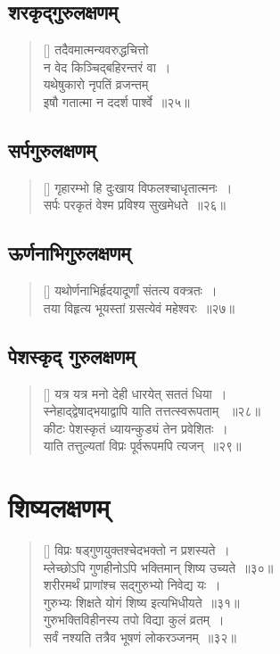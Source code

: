 \documentclass[twoside,12pt,notitlepage]{book}
\begin{document}
\subsection*{शरकृद्‌गुरुलक्षणम्}
\begin{verse}[\versewidth]
तदैवमात्मन्यवरुद्धचित्तो\\[-6pt] न वेद किञ्चिद्बहिरन्तरं वा~।\\[-6pt]
यथेषुकारो नृपतिं व्रजन्तम्\\[-6pt] इषौ गतात्मा न ददर्श पार्श्वे~॥२५॥\footA 
\end{verse}


\subsection*{सर्पगुरुलक्षणम्}
\begin{verse}[\versewidth]
गृहारम्भो हि दुःखाय विफलश्चाधृतात्मनः~।\\[-6pt]
सर्पः परकृतं वेश्म प्रविश्य सुखमेधते~॥२६॥\footA 
\end{verse}



\subsection*{ऊर्णनाभिगुरुलक्षणम्}
\begin{verse}[\versewidth]
यथोर्णनाभिर्हृदयादूर्णां संतत्य वक्त्रतः~।\\[-6pt]
तया विहृत्य भूयस्तां ग्रसत्येवं महेश्वरः~॥२७॥\footA 

\end{verse}

\subsection*{पेशस्कृद् गुरुलक्षणम्}
\begin{verse}[\versewidth]
यत्र यत्र मनो देही धारयेत् सततं धिया~।\\[-6pt]
स्नेहाद्द्वेषाद्भयाद्वापि याति तत्तत्स्वरूपताम् ~॥२८॥\\
कीटः पेशस्कृतं ध्यायन्कुड्यं तेन प्रवेशितः~।\\[-6pt]
याति तत्तुल्यतां विप्रः पूर्वरूपमपि त्यजन्~॥२९॥\footA 

\end{verse}

\section {शिष्यलक्षणम्}
\begin{verse}[\versewidth]
विप्रः षड्गुणयुक्तश्चेदभक्तो न प्रशस्यते~।\\[-6pt]
म्लेच्छोऽपि गुणहीनोऽपि भक्तिमान् शिष्य उच्यते~॥३०॥\footA \\ 
शरीरमर्थं प्राणांश्च सद्गुरुभ्यो निवेद्य यः~।\\[-6pt]
गुरुभ्यः शिक्षते योगं शिष्य इत्यभिधीयते~॥३१॥\\
गुरुभक्तिविहीनस्य तपो विद्या कुलं व्रतम्~।\\[-6pt]
सर्वं नश्यति तत्रैव भूषणं लोकरञ्जनम्~॥३२॥\footA 
\end{verse}
\end{document}
